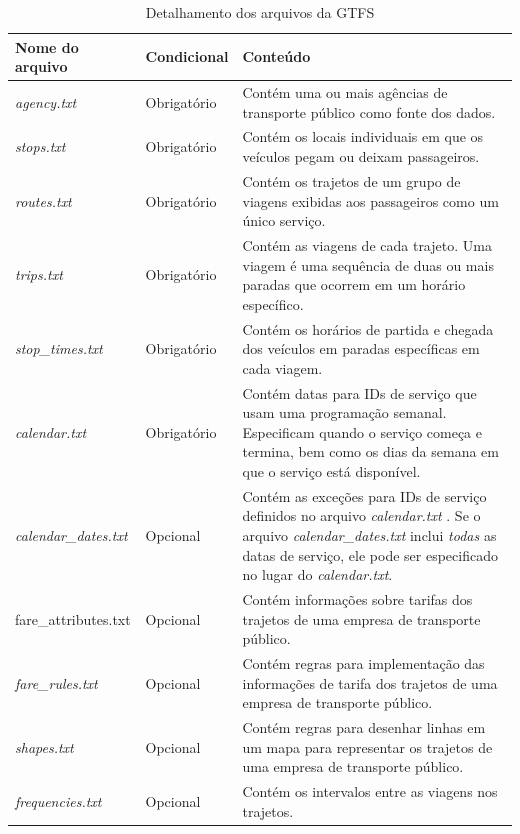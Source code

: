\documentclass[
	12pt,				%
	oneside,			%
	a4paper,			%
	english,			%
	brazil				%
	]{abntex2ppgsi}
\begin{document}
{{\begin{table}[!htb]
  \centering
  \caption{Detalhamento dos arquivos da GTFS}
      \label{tab:gtfsFiles}
\begin{threeparttable}
\begin{tabular}{>{\centering\arraybackslash}m{3.5cm} | >{\centering}m{3cm} | >{\centering\arraybackslash}m{8cm}}
\toprule
    \textbf{Nome do arquivo} & \textbf{Condicional} & \textbf{Conteúdo} \tnote{a} \\
\midrule
\textit{agency.txt} & Obrigatório & Contém uma ou mais agências de transporte público como fonte dos dados. \\
\hline
\textit{stops.txt} & Obrigatório & Contém os locais individuais em que os veículos pegam ou deixam passageiros. \\
\hline
\textit{routes.txt} & Obrigatório & Contém os trajetos de um grupo de viagens exibidas aos passageiros como um único serviço. \\
\hline
\textit{trips.txt} & Obrigatório & Contém as viagens de cada trajeto. Uma viagem é uma sequência de duas ou mais paradas que ocorrem em um horário específico. \\
\hline
\textit{stop\_times.txt} & Obrigatório & Contém os horários de partida e chegada dos veículos em paradas específicas em cada viagem. \\
\hline
\textit{calendar.txt} & Obrigatório & Contém datas para IDs de serviço que usam uma programação semanal. Especificam quando o serviço começa e termina, bem como os dias da semana em que o serviço está disponível. \\
\hline
\textit{calendar\_dates.txt} & Opcional & Contém as exceções para IDs de serviço definidos no arquivo \textit{calendar.txt }. Se o arquivo \textit{calendar\_dates.txt} inclui \textit{todas} as datas de serviço, ele pode ser especificado no lugar do \textit{calendar.txt}. \\
\hline
fare\_attributes.txt & Opcional & Contém informações sobre tarifas dos trajetos de uma empresa de transporte público. \\
\hline
\textit{fare\_rules.txt} & Opcional & Contém regras para implementação das informações de tarifa dos trajetos de uma empresa de transporte público. \\
\hline
\textit{shapes.txt} & Opcional & Contém regras para desenhar linhas em um mapa para representar os trajetos de uma empresa de transporte público. \\
\hline
\textit{frequencies.txt} & Opcional & Contém os intervalos entre as viagens nos trajetos. \\

\end{tabular}
\end{threeparttable}
\end{table}}}
\end{document}
